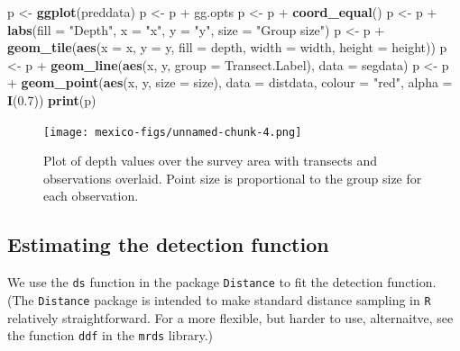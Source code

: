 \documentclass[]{article}
\newenvironment{Shaded}{}{}
\newcommand{\KeywordTok}[1]{\textcolor[rgb]{0.00,0.44,0.13}{\textbf{{#1}}}}
\newcommand{\DataTypeTok}[1]{\textcolor[rgb]{0.56,0.13,0.00}{{#1}}}
\newcommand{\FloatTok}[1]{\textcolor[rgb]{0.25,0.63,0.44}{{#1}}}
\newcommand{\StringTok}[1]{\textcolor[rgb]{0.25,0.44,0.63}{{#1}}}
\newcommand{\NormalTok}[1]{{#1}}
\begin{document}
\begin{Shaded}
\begin{Highlighting}[]
\NormalTok{p <-}\StringTok{ }\KeywordTok{ggplot}\NormalTok{(preddata)}
\NormalTok{p <-}\StringTok{ }\NormalTok{p +}\StringTok{ }\NormalTok{gg.opts}
\NormalTok{p <-}\StringTok{ }\NormalTok{p +}\StringTok{ }\KeywordTok{coord_equal}\NormalTok{()}
\NormalTok{p <-}\StringTok{ }\NormalTok{p +}\StringTok{ }\KeywordTok{labs}\NormalTok{(}\DataTypeTok{fill =} \StringTok{"Depth"}\NormalTok{, }\DataTypeTok{x =} \StringTok{"x"}\NormalTok{, }\DataTypeTok{y =} \StringTok{"y"}\NormalTok{, }\DataTypeTok{size =} \StringTok{"Group size"}\NormalTok{)}
\NormalTok{p <-}\StringTok{ }\NormalTok{p +}\StringTok{ }\KeywordTok{geom_tile}\NormalTok{(}\KeywordTok{aes}\NormalTok{(}\DataTypeTok{x =} \NormalTok{x, }\DataTypeTok{y =} \NormalTok{y, }\DataTypeTok{fill =} \NormalTok{depth, }\DataTypeTok{width =} \NormalTok{width, }\DataTypeTok{height =} \NormalTok{height))}
\NormalTok{p <-}\StringTok{ }\NormalTok{p +}\StringTok{ }\KeywordTok{geom_line}\NormalTok{(}\KeywordTok{aes}\NormalTok{(x, y, }\DataTypeTok{group =} \NormalTok{Transect.Label), }\DataTypeTok{data =} \NormalTok{segdata)}
\NormalTok{p <-}\StringTok{ }\NormalTok{p +}\StringTok{ }\KeywordTok{geom_point}\NormalTok{(}\KeywordTok{aes}\NormalTok{(x, y, }\DataTypeTok{size =} \NormalTok{size), }\DataTypeTok{data =} \NormalTok{distdata, }\DataTypeTok{colour =} \StringTok{"red"}\NormalTok{, }
    \DataTypeTok{alpha =} \KeywordTok{I}\NormalTok{(}\FloatTok{0.7}\NormalTok{))}
\KeywordTok{print}\NormalTok{(p)}
\end{Highlighting}
\end{Shaded}

\begin{figure}[htbp]
\centering
\texttt{[image: mexico-figs/unnamed-chunk-4.png]}
\caption{Plot of depth values over the survey area with transects and
observations overlaid. Point size is proportional to the group size for
each observation.}
\end{figure}

\subsection{Estimating the detection
function}\label{estimating-the-detection-function}

We use the \texttt{ds} function in the package \texttt{Distance} to fit
the detection function. (The \texttt{Distance} package is intended to
make standard distance sampling in \texttt{R} relatively
straightforward. For a more flexible, but harder to use, alternaitve,
see the function \texttt{ddf} in the \texttt{mrds} library.)
\end{document}
